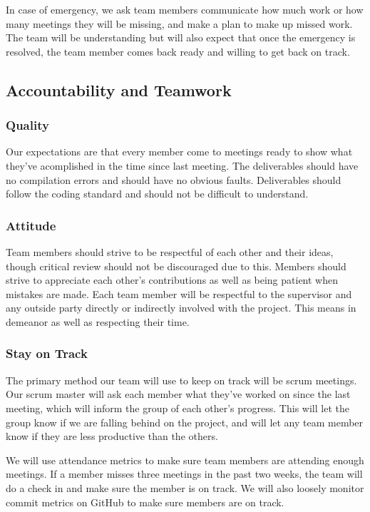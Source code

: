 \documentclass{article}
\begin{document}
In case of emergency, we ask team members communicate how much work or how many meetings they will be missing, and
make a plan to make up missed work. The team will be understanding but will also expect that once the
emergency is resolved, the team member comes back ready and willing to get back on track.

\subsection*{Accountability and Teamwork}

\subsubsection*{Quality} 

Our expectations are that every member come to meetings ready to show what they've acomplished
in the time since last meeting. The deliverables should have no compilation errors and should
have no obvious faults. Deliverables should follow the coding standard and should not be
difficult to understand.

\subsubsection*{Attitude}

Team members should strive to be respectful of each other and their ideas, though critical review should not be discouraged due to this. 
Members should strive to appreciate each other’s contributions as well as being patient when mistakes are made.
Each team member will be respectful to the supervisor and any outside party directly or indirectly involved with the project. This means in demeanor as well as respecting their time.

\subsubsection*{Stay on Track}

The primary method our team will use to keep on track will be scrum meetings.
Our scrum master will ask each member what they've worked on since the last
meeting, which will inform the group of each other's progress. This will let
the group know if we are falling behind on the project, and will let any team
member know if they are less productive than the others.\newline

We will use attendance metrics to make sure team members are attending enough
meetings. If a member misses three meetings in the past two weeks, the team will do a
check in and make sure the member is on track. We will also loosely monitor
commit metrics on GitHub to make sure members are on track. 
\end{document}
